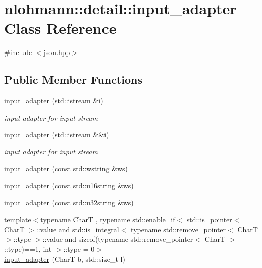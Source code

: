 \hypertarget{classnlohmann_1_1detail_1_1input__adapter}{}\section{nlohmann\+:\+:detail\+:\+:input\+\_\+adapter Class Reference}
\label{classnlohmann_1_1detail_1_1input__adapter}


{\ttfamily \#include $<$json.\+hpp$>$}

\subsection*{Public Member Functions}
\begin{DoxyCompactItemize}
\item 
\hyperlink{classnlohmann_1_1detail_1_1input__adapter_ae89f11268d4724b3080473f7218abe86}{input\+\_\+adapter} (std\+::istream \&i)
\begin{DoxyCompactList}\small\item\em input adapter for input stream \end{DoxyCompactList}\item 
\hyperlink{classnlohmann_1_1detail_1_1input__adapter_af002dd2e53ac0855a03cb68d0ce626b2}{input\+\_\+adapter} (std\+::istream \&\&i)
\begin{DoxyCompactList}\small\item\em input adapter for input stream \end{DoxyCompactList}\item 
\hyperlink{classnlohmann_1_1detail_1_1input__adapter_a32f5ddd06562edce43ee86f5b5c2031b}{input\+\_\+adapter} (const std\+::wstring \&ws)
\item 
\hyperlink{classnlohmann_1_1detail_1_1input__adapter_a58163eaa485b17dd878d3c782efc1e43}{input\+\_\+adapter} (const std\+::u16string \&ws)
\item 
\hyperlink{classnlohmann_1_1detail_1_1input__adapter_abe0015ae09e855f502620315b9dcc3db}{input\+\_\+adapter} (const std\+::u32string \&ws)
\item 
{\footnotesize template$<$typename CharT , typename std\+::enable\+\_\+if$<$ std\+::is\+\_\+pointer$<$ Char\+T $>$\+::value and std\+::is\+\_\+integral$<$ typename std\+::remove\+\_\+pointer$<$ Char\+T $>$\+::type $>$\+::value and sizeof(typename std\+::remove\+\_\+pointer$<$ Char\+T $>$\+::type)==1, int $>$\+::type  = 0$>$ }\\\hyperlink{classnlohmann_1_1detail_1_1input__adapter_a37816622d79ab4a1a76f4d7e872b65e1}{input\+\_\+adapter} (CharT b, std\+::size\+\_\+t l)

\end{DoxyCompactItemize}
